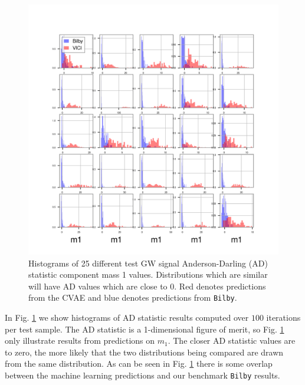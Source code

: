\documentclass[%
showpacs,
 amsmath,amssymb,
 aps,
 twocolumn,
 prl,
 reprint,
floatfix,
]{revtex4-1}
\begin{document}
%
%
\begin{figure}
    \includegraphics[width=\columnwidth]{images/hist-ad_0.png}
    \caption{\label{fig:ad_results} Histograms of 
    25 different test GW signal Anderson-Darling (AD) statistic 
    component mass 1 values. Distributions which are similar 
    will have AD values which are close to 0.
    Red denotes predictions from the CVAE and blue 
    denotes predictions from \texttt{Bilby}.}
\end{figure}

In Fig. \ref{fig:ad_results} we show histograms of AD 
statistic results computed over $100$ iterations per test sample. 
The AD statistic is a 1-dimensional figure of merit, 
so Fig. \ref{fig:ad_results} only illustrate results 
from predictions on $m_1$. The closer AD statistic 
values are to zero, the more likely that the two 
distributions being compared are drawn from 
the same distribution. As can be seen in Fig. \ref{fig:ad_results} 
there is some overlap between the machine learning 
predictions and our benchmark \texttt{Bilby} results.
\end{document}
